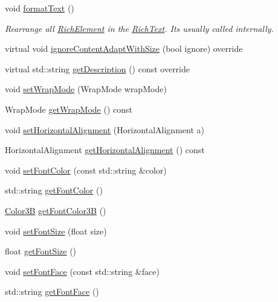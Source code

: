 \begin{DoxyCompactItemize}
\mbox{\label{classui_1_1RichText_a4694a2d2bca0645209f9edeb675cb76a}} 
void \hyperlink{classui_1_1RichText_a4694a2d2bca0645209f9edeb675cb76a}{format\+Text} ()
\begin{DoxyCompactList}\small\item\em Rearrange all \hyperlink{classui_1_1RichElement}{Rich\+Element} in the \hyperlink{classui_1_1RichText}{Rich\+Text}. It\textquotesingle{}s usually called internally. \end{DoxyCompactList}\item 
virtual void \hyperlink{classui_1_1RichText_a82b3965a42f134415afab5605ef73ffa}{ignore\+Content\+Adapt\+With\+Size} (bool ignore) override
\item 
virtual std\+::string \hyperlink{classui_1_1RichText_aeae6c6fd1f11e9342ada2ef87dbf8681}{get\+Description} () const override
\item 
void \hyperlink{classui_1_1RichText_a19f13164d96c8c3374c394c59dce40f5}{set\+Wrap\+Mode} (Wrap\+Mode wrap\+Mode)
\item 
Wrap\+Mode \hyperlink{classui_1_1RichText_ae502474a4a692215e7458ff13a46c623}{get\+Wrap\+Mode} () const
\item 
void \hyperlink{classui_1_1RichText_a027387771913d560334d2711ee77ee9d}{set\+Horizontal\+Alignment} (Horizontal\+Alignment a)
\item 
Horizontal\+Alignment \hyperlink{classui_1_1RichText_a491a30899b80e68cc539bff9c075f9d4}{get\+Horizontal\+Alignment} () const
\item 
void \hyperlink{classui_1_1RichText_a5cd519c793200b5aaccfdb0fa8892e9a}{set\+Font\+Color} (const std\+::string \&color)
\item 
std\+::string \hyperlink{classui_1_1RichText_a9bfe97a06ce0d02b42d6709050e57bbc}{get\+Font\+Color} ()
\item 
\hyperlink{structColor3B}{Color3B} \hyperlink{classui_1_1RichText_a43e534f4c1307afa1f8ba91c9dee49c8}{get\+Font\+Color3B} ()
\item 
void \hyperlink{classui_1_1RichText_a60d0a694863a77b5608c59f49ceda3c1}{set\+Font\+Size} (float size)
\item 
float \hyperlink{classui_1_1RichText_af30313070309eb44097c18abcedb4957}{get\+Font\+Size} ()
\item 
void \hyperlink{classui_1_1RichText_a9ea95bec970e9f1c03ba0bf34c11b93d}{set\+Font\+Face} (const std\+::string \&face)
\item 
std\+::string \hyperlink{classui_1_1RichText_a72a70b40c13af3bd2f921c50f734fef5}{get\+Font\+Face} ()

\end{DoxyCompactItemize}
